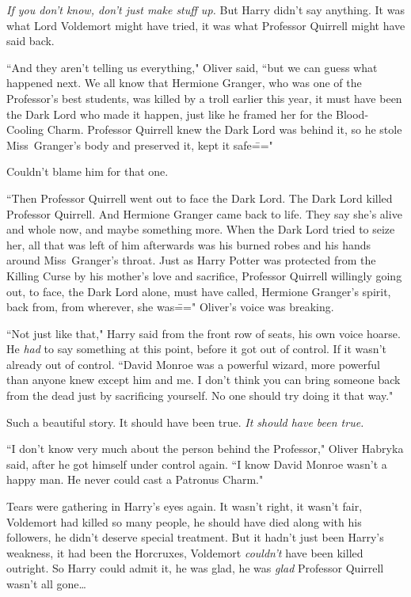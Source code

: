 \emph{If you don't know, don't just make stuff up.} But Harry didn't say anything. It was what Lord Voldemort might have tried, it was what Professor Quirrell might have said back.

``And they aren't telling us everything," Oliver said, ``but we can guess what happened next. We all know that Hermione Granger, who was one of the Professor's best students, was killed by a troll earlier this year, it must have been the Dark Lord who made it happen, just like he framed her for the Blood-Cooling Charm. Professor Quirrell knew the Dark Lord was behind it, so he stole Miss~Granger's body and preserved it, kept it safe\==="

Couldn't blame him for that one.

``Then Professor Quirrell went out to face the Dark Lord. The Dark Lord killed Professor Quirrell. And Hermione Granger came back to life. They say she's alive and whole now, and maybe something more. When the Dark Lord tried to seize her, all that was left of him afterwards was his burned robes and his hands around Miss~Granger's throat. Just as Harry Potter was protected from the Killing Curse by his mother's love and sacrifice, Professor Quirrell willingly going out, to face, the Dark Lord alone, must have called, Hermione Granger's spirit, back from, from wherever, she was\===" Oliver's voice was breaking.

``Not just like that," Harry said from the front row of seats, his own voice hoarse. He \emph{had} to say something at this point, before it got out of control. If it wasn't already out of control. ``David Monroe was a powerful wizard, more powerful than anyone knew except him and me. I don't think you can bring someone back from the dead just by sacrificing yourself. No one should try doing it that way."

Such a beautiful story. It should have been true. \emph{It should have been true.}

``I don't know very much about the person behind the Professor," Oliver Habryka said, after he got himself under control again. ``I know David Monroe wasn't a happy man. He never could cast a Patronus Charm."

Tears were gathering in Harry's eyes again. It wasn't right, it wasn't fair, Voldemort had killed so many people, he should have died along with his followers, he didn't deserve special treatment. But it hadn't just been Harry's weakness, it had been the Horcruxes, Voldemort \emph{couldn't} have been killed outright. So Harry could admit it, he was glad, he was \emph{glad} Professor Quirrell wasn't all gone{\ldots}

